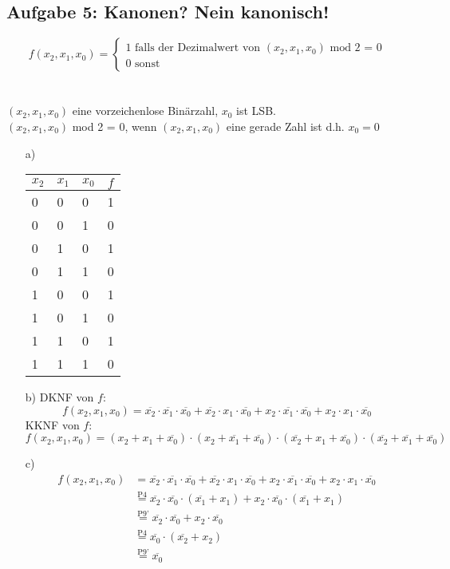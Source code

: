 \documentclass{article}
\newcommand{\nyet}{\overline}
\begin{document}
    
    \subsection*{Aufgabe 5: Kanonen? Nein kanonisch!}
    \[
    f(x_2,x_1,x_0) = \begin{cases}
    	1 \text{ falls der Dezimalwert von }(x_2,x_1,x_0) \text{ mod 2 = 0} \\
    	0 \text{ sonst}
    	\end{cases}    
    \]\\\\
    $(x_2,x_1,x_0)$ eine vorzeichenlose Binärzahl, $x_0$ ist LSB.\\
    $(x_2,x_1,x_0)$ mod 2 = 0, wenn $(x_2,x_1,x_0)$ eine gerade Zahl ist d.h. $x_0 = 0$
    \begin{itemize}
    	\item[a)]
    	\begin{tabular}[t]{lll|l}
    		$x_2$&$x_1$&$x_0$&$f$ \\
    		\hline
    		0&0&0&1 \\
    		0&0&1&0 \\
    		0&1&0&1 \\
    		0&1&1&0 \\
    		1&0&0&1 \\
    		1&0&1&0 \\
    		1&1&0&1 \\
    		1&1&1&0 \\
    	\end{tabular}
    	\item[b)]DKNF von $f$: $$f(x_2,x_1,x_0) = \nyet{x_2}\cdot\nyet{x_1}\cdot\nyet{x_0} + \nyet{x_2}\cdot x_1\cdot\nyet{x_0} + x_2\cdot\nyet{x_1}\cdot\nyet{x_0} + x_2\cdot x_1\cdot\nyet{x_0}$$
    	KKNF von $f$: $$f(x_2,x_1,x_0) = (x_2+x_1+\nyet{x_0})\cdot(x_2+\nyet{x_1}+\nyet{x_0})\cdot(\nyet{x_2}+x_1+\nyet{x_0})\cdot(\nyet{x_2}+\nyet{x_1}+\nyet{x_0})$$
    	\item[c)]
    	\begin{align*}
    		f(x_2,x_1,x_0) & = \nyet{x_2}\cdot\nyet{x_1}\cdot\nyet{x_0} + \nyet{x_2}\cdot x_1\cdot\nyet{x_0} + x_2\cdot\nyet{x_1}\cdot\nyet{x_0} + x_2\cdot x_1\cdot\nyet{x_0} \\
    		& \stackrel{\text{P4}}{=} \nyet{x_2} \cdot\nyet{x_0}\cdot(\nyet{x_1} + x_1) + x_2 \cdot\nyet{x_0}\cdot(\nyet{x_1} + x_1) \\
    		& \stackrel{\text{P9'}}{=} \nyet{x_2} \cdot\nyet{x_0} + x_2 \cdot\nyet{x_0} \\
    		& \stackrel{\text{P4}}{=} \nyet{x_0}\cdot(\nyet{x_2} + x_2) \\
    		& \stackrel{\text{P9'}}{=} \nyet{x_0}
    	\end{align*}
	\end{itemize}
	
\end{document}
